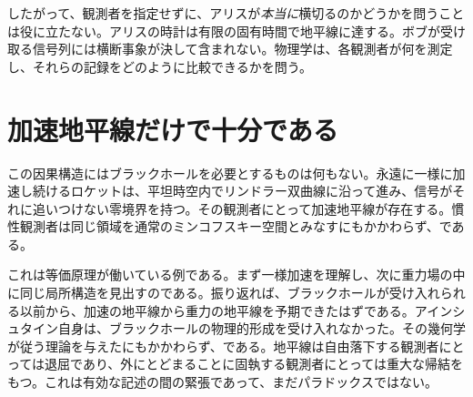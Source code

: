 \begin{classroomqa}
\end{classroomqa}

したがって、観測者を指定せずに、アリスが\emph{本当に}横切るのかどうかを問うことは役に立たない。アリスの時計は有限の固有時間で地平線に達する。ボブが受け取る信号列には横断事象が決して含まれない。物理学は、各観測者が何を測定し、それらの記録をどのように比較できるかを問う。

\begin{classroomqa}
\end{classroomqa}

\section{加速地平線だけで十分である}

この因果構造にはブラックホールを必要とするものは何もない。永遠に一様に加速し続けるロケットは、平坦時空内でリンドラー双曲線に沿って進み、信号がそれに追いつけない零境界を持つ。その観測者にとって加速地平線が存在する。慣性観測者は同じ領域を通常のミンコフスキー空間とみなすにもかかわらず、である。

\begin{classroomqa}
\end{classroomqa}

これは等価原理が働いている例である。まず一様加速を理解し、次に重力場の中に同じ局所構造を見出すのである。振り返れば、ブラックホールが受け入れられる以前から、加速の地平線から重力の地平線を予期できたはずである。アインシュタイン自身は、ブラックホールの物理的形成を受け入れなかった。その幾何学が従う理論を与えたにもかかわらず、である。地平線は自由落下する観測者にとっては退屈であり、外にとどまることに固執する観測者にとっては重大な帰結をもつ。これは有効な記述の間の緊張であって、まだパラドックスではない。

